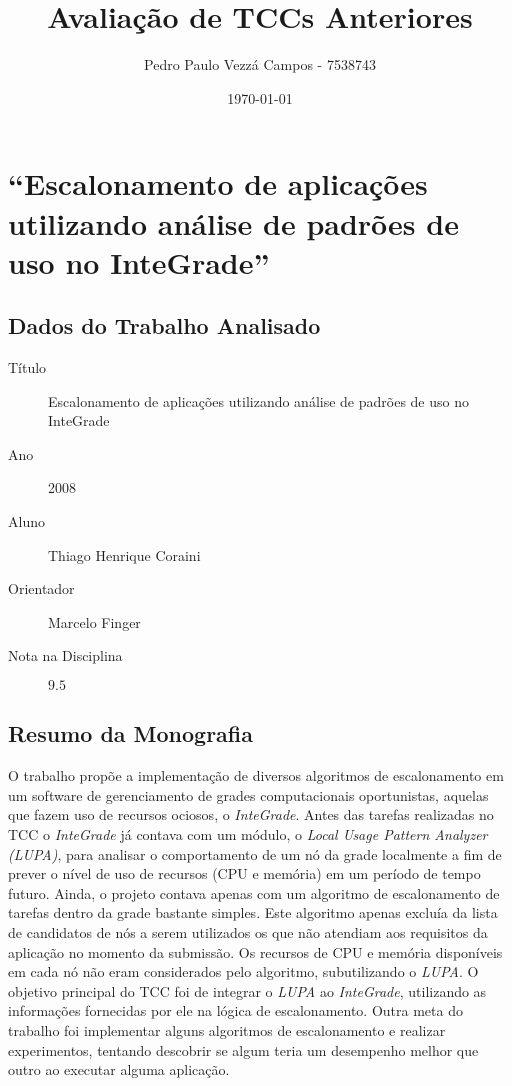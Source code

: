 \documentclass{article}
\begin{document}
\title{Avaliação de TCCs Anteriores}
\author{Pedro Paulo Vezzá Campos - 7538743}
\date{\today}
\maketitle

\section{``Escalonamento de aplicações utilizando análise de padrões de uso no InteGrade''}
\subsection{Dados do Trabalho Analisado}
	\begin{description}
		\item[Título] Escalonamento de aplicações utilizando análise de padrões de uso no InteGrade
		\item[Ano] 2008
		\item[Aluno] Thiago Henrique Coraini 
		\item[Orientador] Marcelo Finger
		\item[Nota na Disciplina] $9.5$
	\end{description}

\subsection{Resumo da Monografia}
	O trabalho propõe a implementação de diversos algoritmos de escalonamento em um software de gerenciamento de grades computacionais oportunistas, aquelas que fazem uso de recursos ociosos, o \emph{InteGrade}. Antes das tarefas realizadas no TCC o \emph{InteGrade} já contava com um módulo, o \emph{Local Usage Pattern Analyzer (LUPA)}, para analisar o comportamento de um nó da grade localmente a fim de prever o nível de uso de recursos (CPU e memória) em um período de tempo futuro. Ainda, o projeto contava apenas com um algoritmo de escalonamento de tarefas dentro da grade bastante simples. Este algoritmo apenas excluía da lista de candidatos de nós a serem utilizados os que não atendiam aos requisitos da aplicação no momento da submissão. Os recursos de CPU e memória disponíveis em cada nó não eram considerados pelo algoritmo, subutilizando o \emph{LUPA}. O objetivo principal do TCC foi de integrar o \emph{LUPA} ao \emph{InteGrade}, utilizando as informações fornecidas por ele na lógica de escalonamento. Outra meta do trabalho foi implementar alguns algoritmos de escalonamento e realizar experimentos, tentando descobrir se algum teria um desempenho melhor que outro ao executar alguma aplicação.
	
\end{document}
